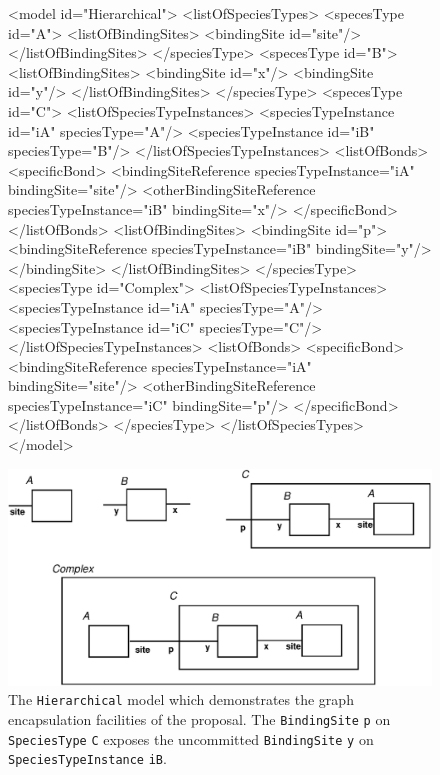 \documentclass{cekarticle}
\begin{document}
\begin{figure}

\begin{example}
<model id="Hierarchical">
    <listOfSpeciesTypes>
        <specesType id="A">
            <listOfBindingSites>
                <bindingSite id="site"/>
            </listOfBindingSites>
        </speciesType>
        <specesType id="B">
            <listOfBindingSites>
                <bindingSite id="x"/>
                <bindingSite id="y"/>
            </listOfBindingSites>
        </speciesType>
        <specesType id="C">
            <listOfSpeciesTypeInstances>
                <speciesTypeInstance id="iA" speciesType="A"/>
                <speciesTypeInstance id="iB" speciesType="B"/>
            </listOfSpeciesTypeInstances>
            <listOfBonds>
                <specificBond>
                    <bindingSiteReference speciesTypeInstance="iA" bindingSite="site"/>
                    <otherBindingSiteReference speciesTypeInstance="iB" bindingSite="x"/>
                </specificBond>
            </listOfBonds>
            <listOfBindingSites>
                <bindingSite id="p">
                    <bindingSiteReference speciesTypeInstance="iB" bindingSite="y"/>
                </bindingSite>
            </listOfBindingSites>
        </speciesType>
        <speciesType id="Complex">
            <listOfSpeciesTypeInstances>
                <speciesTypeInstance id="iA" speciesType="A"/>
                <speciesTypeInstance id="iC" speciesType="C"/>
            </listOfSpeciesTypeInstances>
            <listOfBonds>
                <specificBond>
                    <bindingSiteReference speciesTypeInstance="iA" bindingSite="site"/>
                    <otherBindingSiteReference speciesTypeInstance="iC" bindingSite="p"/>
                </specificBond>
            </listOfBonds>
        </speciesType>
    </listOfSpeciesTypes>
</model>
\end{example}
  \vspace*{8pt}
  \centering
  \includegraphics[scale = 0.7]{hierarchial.eps}
\caption{The \texttt{Hierarchical} model which demonstrates the graph encapsulation facilities of
the proposal.  The \texttt{BindingSite} \texttt{p} on \texttt{SpeciesType} \texttt{C} exposes the
uncommitted \texttt{BindingSite} \texttt{y} on \texttt{SpeciesTypeInstance} \texttt{iB}.}
\label{fig:hierarchial}
\end{figure}
\end{document}
